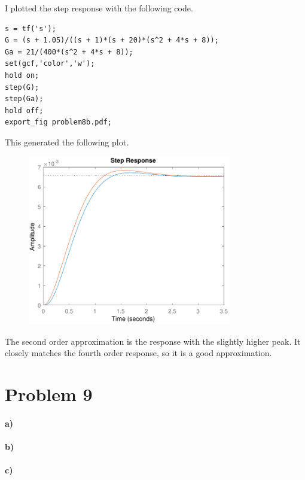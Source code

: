 \documentclass[12pt]{article}
\begin{document}
I plotted the step response with the following code.
\begin{verbatim}
s = tf('s');
G = (s + 1.05)/((s + 1)*(s + 20)*(s^2 + 4*s + 8));
Ga = 21/(400*(s^2 + 4*s + 8));
set(gcf,'color','w');
hold on;
step(G);
step(Ga);
hold off;
export_fig problem8b.pdf;
\end{verbatim}
This generated the following plot.
\begin{figure}[H]
    \begin{center}
        \includegraphics[width=3.5in]{problem8b.pdf}
    \end{center}
\end{figure}
The second order approximation is the response with the slightly higher peak. It closely matches the fourth order response, so
it is a good approximation.

\section*{Problem 9}

\paragraph{a)}

\paragraph{b)}

\paragraph{c)}
\end{document}
